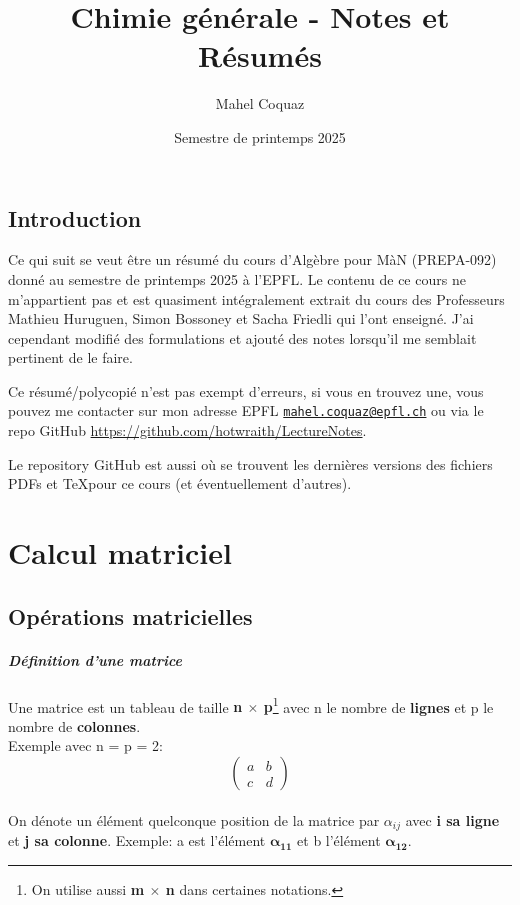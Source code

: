 \documentclass[10pt,a4paper]{book}
\title{Chimie générale \vspace{0.2cm} - Notes et Résumés}
\author{Mahel Coquaz}
\date{Semestre de printemps 2025}
\newcommand{\x}{$\times$ }
\begin{document}
\maketitle
\tableofcontents
\newpage
\section*{Introduction}
Ce qui suit se veut être un résumé du cours d'Algèbre pour MàN (PREPA-092) donné au semestre de printemps 2025 à l'EPFL. Le contenu de ce cours ne m'appartient pas et est quasiment intégralement extrait du cours des Professeurs Mathieu Huruguen, Simon Bossoney et Sacha Friedli qui l'ont enseigné. J'ai cependant modifié des formulations et ajouté des notes lorsqu'il me semblait pertinent de le faire. \par
Ce résumé/polycopié n'est pas exempt d'erreurs, si vous en trouvez une, vous pouvez me contacter sur mon adresse EPFL \texttt{\href{mailto:mahel.coquaz@epfl.ch}{mahel.coquaz@epfl.ch}} ou via le repo GitHub \url{https://github.com/hotwraith/LectureNotes}. \par
Le repository GitHub est aussi où se trouvent les dernières versions des fichiers PDFs et \TeX pour ce cours (et éventuellement d'autres).

\chapter{Calcul matriciel}

\section{Opérations matricielles}

\paragraph{Définition d'une matrice} Une matrice est un tableau de taille \textbf{n \x p}\footnote{On utilise aussi \textbf{m \x n} dans certaines notations.} avec n le nombre de \textbf{lignes} et p le nombre de \textbf{colonnes}. \\
Exemple avec n = p = 2:
\[\begin{pmatrix}
a & b \\
c & d
\end{pmatrix}\] \\
On dénote un élément quelconque position de la matrice par $\alpha_{ij}$ avec \textbf{i sa ligne} et \textbf{j sa colonne}. Exemple: a est l'élément $\mathbf{\alpha_{11}}$ et b l'élément $\mathbf{\alpha_{12}}$.
\end{document}
